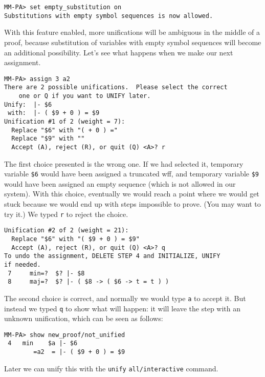 \begin{verbatim}
MM-PA> set empty_substitution on
Substitutions with empty symbol sequences is now allowed.
\end{verbatim}

With this feature enabled, more unifications will be
ambiguous in
the middle of a proof, because
substitution
of variables with empty symbol sequences will become an additional
possibility.  Let's see what happens when we make our next assignment.

\begin{verbatim}
MM-PA> assign 3 a2
There are 2 possible unifications.  Please select the correct
    one or Q if you want to UNIFY later.
Unify:  |- $6
 with:  |- ( $9 + 0 ) = $9
Unification #1 of 2 (weight = 7):
  Replace "$6" with "( + 0 ) ="
  Replace "$9" with ""
  Accept (A), reject (R), or quit (Q) <A>? r
\end{verbatim}

The first choice presented is the wrong one.  If we had selected it,
temporary variable \texttt{\$6} would have been assigned a truncated
wff, and temporary variable \texttt{\$9} would have been assigned an
empty sequence (which is not allowed in our system).  With this choice,
eventually we would reach a point where we would get stuck because
we would end up with steps impossible to prove.  (You may want to
try it.)  We typed \texttt{r} to reject the choice.

\begin{verbatim}
Unification #2 of 2 (weight = 21):
  Replace "$6" with "( $9 + 0 ) = $9"
  Accept (A), reject (R), or quit (Q) <A>? q
To undo the assignment, DELETE STEP 4 and INITIALIZE, UNIFY
if needed.
 7     min=?  $? |- $8
 8     maj=?  $? |- ( $8 -> ( $6 -> t = t ) )
\end{verbatim}

The second choice is correct, and normally we would type \texttt{a}
to accept it.  But instead we typed \texttt{q} to show what will happen:
it will leave the step with an unknown unification, which can be
seen as follows:

\begin{verbatim}
MM-PA> show new_proof/not_unified
 4   min    $a |- $6
        =a2  = |- ( $9 + 0 ) = $9
\end{verbatim}

Later we can unify this with the \texttt{unify}
\texttt{all/interactive} command.

